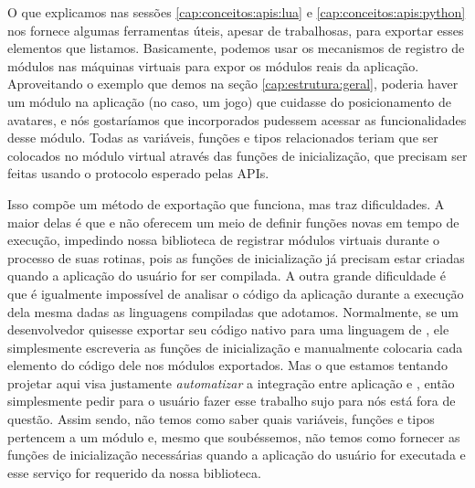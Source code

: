     O que explicamos nas sessões \ref{cap:conceitos:apis:lua} e
    \ref{cap:conceitos:apis:python} nos fornece algumas ferramentas úteis,
    apesar de trabalhosas, para exportar esses elementos que listamos.
    Basicamente, podemos usar os mecanismos de registro de módulos nas máquinas
    virtuais para expor os módulos reais da aplicação\footnotemark{}. Aproveitando
    o exemplo que demos na seção \ref{cap:estrutura:geral}, poderia haver um
    módulo na aplicação (no caso, um jogo) que cuidasse do posicionamento de
    avatares, e nós gostaríamos que  incorporados pudessem acessar
    as funcionalidades desse módulo. Todas as variáveis, funções e tipos relacionados
    teriam que ser colocados no módulo virtual através das funções de
    inicialização, que precisam ser feitas usando o protocolo esperado pelas
    APIs.


    Isso compõe um método de exportação que funciona, mas traz dificuldades. A
    maior delas é que \C{} e \CXX{} não oferecem um meio de definir funções
    novas em tempo de execução, impedindo nossa biblioteca de registrar módulos
    virtuais durante o processo de suas rotinas, pois as funções de inicialização já precisam
    estar criadas quando a aplicação do usuário for ser compilada. A outra
    grande dificuldade é que é igualmente impossível de analisar o código da
    aplicação durante a execução dela mesma dadas as linguagens compiladas que
    adotamos. Normalmente, se um desenvolvedor quisesse exportar seu código
    nativo para uma linguagem de \script{}, ele simplesmente escreveria as
    funções de inicialização e manualmente colocaria cada elemento do código
    dele nos módulos exportados. Mas o que estamos tentando projetar aqui visa
    justamente \emph{automatizar} a integração entre aplicação e , então
    simplesmente pedir para o usuário fazer esse trabalho sujo para nós está
    fora de questão. Assim sendo, não temos como saber quais variáveis, funções
    e tipos pertencem a um módulo e, mesmo que soubéssemos, não temos como
    fornecer as funções de inicialização necessárias quando a aplicação do
    usuário for executada e esse serviço for requerido da nossa biblioteca.
    
